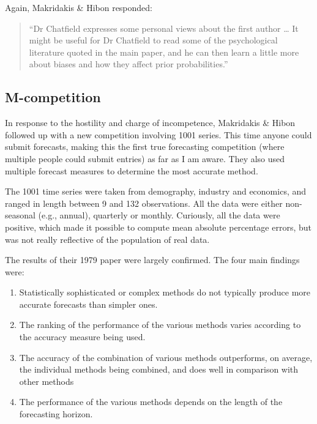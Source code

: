 \documentclass[11pt,a4paper,]{article}
\providecommand{\tightlist}{%
  \setlength{\itemsep}{0pt}\setlength{\parskip}{0pt}}
\begin{document}
Again, Makridakis \& Hibon responded:

\begin{quote}
``Dr Chatfield expresses some personal views about the first author \ldots{} It might be useful for Dr Chatfield to read some of the psychological literature quoted in the main paper, and he can then learn a little more about biases and how they affect prior probabilities.''
\end{quote}

\hypertarget{m-competition}{%
\subsection*{M-competition}\label{m-competition}}

In response to the hostility and charge of incompetence, Makridakis \& Hibon followed up with a new competition involving 1001 series. This time anyone could submit forecasts, making this the first true forecasting competition (where multiple people could submit entries) as far as I am aware. They also used multiple forecast measures to determine the most accurate method.

The 1001 time series were taken from demography, industry and economics, and ranged in length between 9 and 132 observations. All the data were either non-seasonal (e.g., annual), quarterly or monthly. Curiously, all the data were positive, which made it possible to compute mean absolute percentage errors, but was not really reflective of the population of real data.

The results of their 1979 paper were largely confirmed. The four main findings \autocite[taken from][]{Fildes1998} were:

\begin{enumerate}
\def\labelenumi{\arabic{enumi}.}
\tightlist
\item
  Statistically sophisticated or complex methods do not typically produce more accurate forecasts than simpler ones.
\item
  The ranking of the performance of the various methods varies according to the accuracy measure being used.
\item
  The accuracy of the combination of various methods outperforms, on average, the individual methods being combined, and does well in comparison with other methods
\item
  The performance of the various methods depends on the length of the forecasting horizon.
\end{enumerate}
\end{document}
